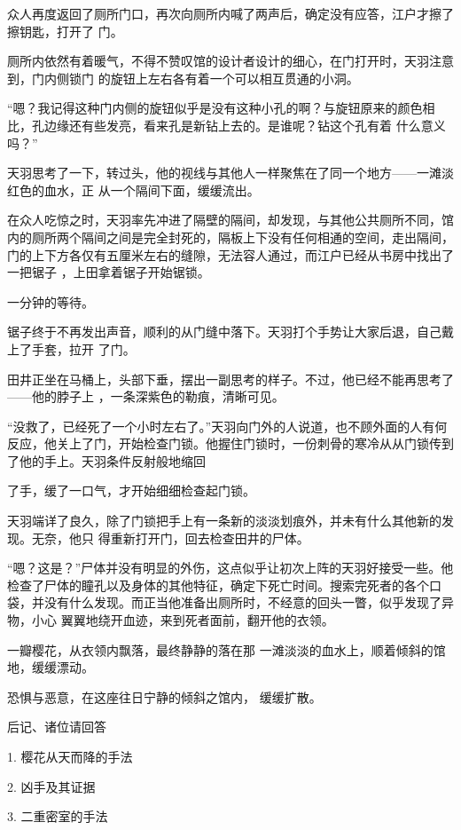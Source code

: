 \documentclass{article}
\begin{document}
众人再度返回了厕所门口，再次向厕所内喊了两声后，确定没有应答，江户才擦了擦钥匙，打开了
门。 

厕所内依然有着暖气，不得不赞叹馆的设计者设计的细心，在门打开时，天羽注意到，门内侧锁门
的旋钮上左右各有着一个可以相互贯通的小洞。 

“嗯？我记得这种门内侧的旋钮似乎是没有这种小孔的啊？与旋钮原来的颜色相比，孔边缘还有些发亮，看来孔是新钻上去的。是谁呢？钻这个孔有着
什么意义吗？” 

天羽思考了一下，转过头，他的视线与其他人一样聚焦在了同一个地方——一滩淡红色的血水，正
从一个隔间下面，缓缓流出。 

\newpage

在众人吃惊之时，天羽率先冲进了隔壁的隔间，却发现，与其他公共厕所不同，馆内的厕所两个隔间之间是完全封死的，隔板上下没有任何相通的空间，走出隔间，门的上下方各仅有五厘米左右的缝隙，无法容人通过，而江户已经从书房中找出了一把锯子
，上田拿着锯子开始锯锁。 


一分钟的等待。 

锯子终于不再发出声音，顺利的从门缝中落下。天羽打个手势让大家后退，自己戴上了手套，拉开
了门。 

田井正坐在马桶上，头部下垂，摆出一副思考的样子。不过，他已经不能再思考了——他的脖子上
，一条深紫色的勒痕，清晰可见。 

“没救了，已经死了一个小时左右了。”天羽向门外的人说道，也不顾外面的人有何反应，他关上了门，开始检查门锁。他握住门锁时，一份刺骨的寒冷从从门锁传到了他的手上。天羽条件反射般地缩回
\newpage

了手，缓了一口气，才开始细细检查起门锁。 

天羽端详了良久，除了门锁把手上有一条新的淡淡划痕外，并未有什么其他新的发现。无奈，他只
得重新打开门，回去检查田井的尸体。 

“嗯？这是？”尸体并没有明显的外伤，这点似乎让初次上阵的天羽好接受一些。他检查了尸体的瞳孔以及身体的其他特征，确定下死亡时间。搜索完死者的各个口袋，并没有什么发现。而正当他准备出厕所时，不经意的回头一瞥，似乎发现了异物，小心
翼翼地绕开血迹，来到死者面前，翻开他的衣领。 

一瓣樱花，从衣领内飘落，最终静静的落在那
一滩淡淡的血水上，顺着倾斜的馆地，缓缓漂动。 

恐惧与恶意，在这座往日宁静的倾斜之馆内，
缓缓扩散。 


后记、诸位请回答 

\newpage


1. 樱花从天而降的手法 


2. 凶手及其证据 

3. 二重密室的手法
\end{document}
